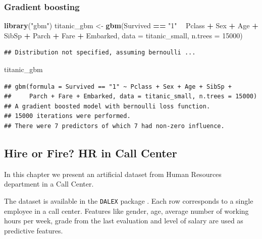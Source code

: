 \documentclass[]{krantz}
\newenvironment{Shaded}{\begin{snugshade}}{\end{snugshade}}
\newcommand{\DataTypeTok}[1]{\textcolor[rgb]{0.13,0.29,0.53}{#1}}
\newcommand{\DecValTok}[1]{\textcolor[rgb]{0.00,0.00,0.81}{#1}}
\newcommand{\KeywordTok}[1]{\textcolor[rgb]{0.13,0.29,0.53}{\textbf{#1}}}
\newcommand{\NormalTok}[1]{#1}
\newcommand{\OperatorTok}[1]{\textcolor[rgb]{0.81,0.36,0.00}{\textbf{#1}}}
\newcommand{\StringTok}[1]{\textcolor[rgb]{0.31,0.60,0.02}{#1}}
\theoremstyle{definition}
\theoremstyle{definition}
\theoremstyle{definition}
\theoremstyle{remark}
\begin{document}
\hypertarget{gradient-boosting}{%
\subsubsection{Gradient boosting}\label{gradient-boosting}}

\begin{Shaded}
\begin{Highlighting}[]
\KeywordTok{library}\NormalTok{(}\StringTok{"gbm"}\NormalTok{)}
\NormalTok{titanic_gbm <-}\StringTok{ }\KeywordTok{gbm}\NormalTok{(Survived }\OperatorTok{==}\StringTok{ "1"} \OperatorTok{~}\StringTok{ }\NormalTok{Pclass }\OperatorTok{+}\StringTok{ }\NormalTok{Sex }\OperatorTok{+}\StringTok{ }\NormalTok{Age }\OperatorTok{+}\StringTok{ }\NormalTok{SibSp }\OperatorTok{+}
\StringTok{                     }\NormalTok{Parch }\OperatorTok{+}\StringTok{ }\NormalTok{Fare }\OperatorTok{+}\StringTok{ }\NormalTok{Embarked, }\DataTypeTok{data =}\NormalTok{ titanic_small, }\DataTypeTok{n.trees =} \DecValTok{15000}\NormalTok{)}
\end{Highlighting}
\end{Shaded}

\begin{verbatim}
## Distribution not specified, assuming bernoulli ...
\end{verbatim}

\begin{Shaded}
\begin{Highlighting}[]
\NormalTok{titanic_gbm}
\end{Highlighting}
\end{Shaded}

\begin{verbatim}
## gbm(formula = Survived == "1" ~ Pclass + Sex + Age + SibSp + 
##     Parch + Fare + Embarked, data = titanic_small, n.trees = 15000)
## A gradient boosted model with bernoulli loss function.
## 15000 iterations were performed.
## There were 7 predictors of which 7 had non-zero influence.
\end{verbatim}

\hypertarget{HRdataset}{%
\subsection{Hire or Fire? HR in Call Center}\label{HRdataset}}

In this chapter we present an artificial dataset from Human Resources
department in a Call Center.

The dataset is available in the \texttt{DALEX} package \citep{R-DALEX}.
Each row corresponds to a single employee in a call center. Features
like gender, age, average number of working hours per week, grade from
the last evaluation and level of salary are used as predictive features.
\end{document}
